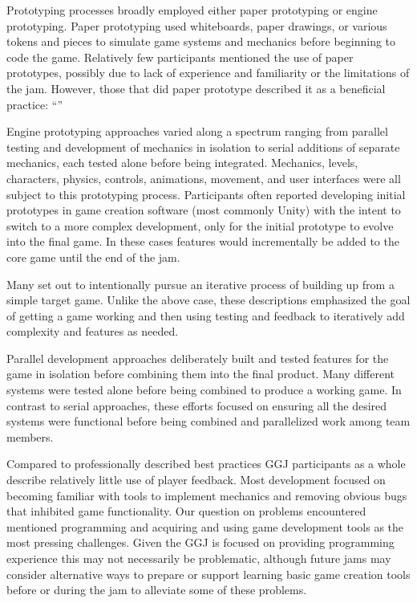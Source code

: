 \documentclass{sig-alternate}
\begin{document}
Prototyping processes broadly employed either paper prototyping or engine prototyping. Paper prototyping used whiteboards, paper drawings, or various tokens and pieces to simulate game systems and mechanics before beginning to code the game. Relatively few participants mentioned the use of paper prototypes, possibly due to lack of experience and familiarity or the limitations of the jam. However, those that did paper prototype described it as a beneficial practice:
``''

Engine prototyping approaches varied along a spectrum ranging from parallel testing and development of mechanics in isolation to serial additions of separate mechanics, each tested alone before being integrated. Mechanics, levels, characters, physics, controls, animations, movement, and user interfaces were all subject to this prototyping process. 
Participants often reported developing initial prototypes in game creation software (most commonly Unity) with the intent to switch to a more complex development, only for the initial prototype to evolve into the final game. In these cases features would incrementally be added to the core game until the end of the jam.

Many set out to intentionally pursue an iterative process of building up from a simple target game. Unlike the above case, these descriptions emphasized the goal of getting a game working and then using testing and feedback to iteratively add complexity and features as needed.

Parallel development approaches deliberately built and tested features for the game in isolation before combining them into the final product. Many different systems were tested alone before being combined to produce a working game. In contrast to serial approaches, these efforts focused on ensuring all the desired systems were functional before being combined and parallelized work among team members.

Compared to professionally described best practices \cite{fullerton2008:playcentric} GGJ participants as a whole describe relatively little use of player feedback. Most development focused on becoming familiar with tools to implement mechanics and removing obvious bugs that inhibited game functionality. Our question on problems encountered mentioned programming and acquiring and using game development tools as the most pressing challenges. Given the GGJ is focused on providing programming experience this may not necessarily be problematic, although future jams may consider alternative ways to prepare or support learning basic game creation tools before or during the jam to alleviate some of these problems.
\end{document}
